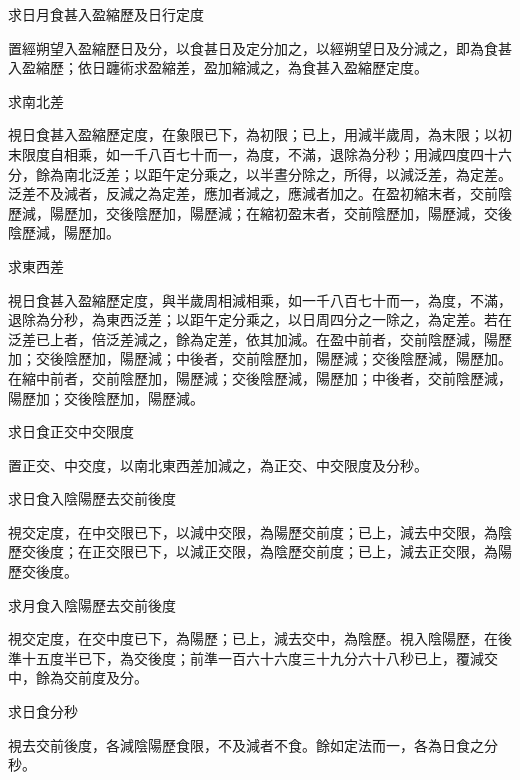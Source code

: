 \begin{pinyinscope}
 求日月食甚入盈縮歷及日行定度



 置經朔望入盈縮歷日及分，以食甚日及定分加之，以經朔望日及分減之，即為食甚入盈縮歷；依日躔術求盈縮差，盈加縮減之，為食甚入盈縮歷定度。



 求南北差



 視日食甚入盈縮歷定度，在象限已下，為初限；已上，用減半歲周，為末限；以初末限度自相乘，如一千八百七十而一，為度，不滿，退除為分秒；用減四度四十六分，餘為南北泛差；以距午定分乘之，以半晝分除之，所得，以減泛差，為定差。泛差不及減者，反減之為定差，應加者減之，應減者加之。在盈初縮末者，交前陰歷減，陽歷加，交後陰歷加，陽歷減；在縮初盈末者，交前陰歷加，陽歷減，交後陰歷減，陽歷加。



 求東西差



 視日食甚入盈縮歷定度，與半歲周相減相乘，如一千八百七十而一，為度，不滿，退除為分秒，為東西泛差；以距午定分乘之，以日周四分之一除之，為定差。若在泛差已上者，倍泛差減之，餘為定差，依其加減。在盈中前者，交前陰歷減，陽歷加；交後陰歷加，陽歷減；中後者，交前陰歷加，陽歷減；交後陰歷減，陽歷加。在縮中前者，交前陰歷加，陽歷減；交後陰歷減，陽歷加；中後者，交前陰歷減，陽歷加；交後陰歷加，陽歷減。



 求日食正交中交限度



 置正交、中交度，以南北東西差加減之，為正交、中交限度及分秒。



 求日食入陰陽歷去交前後度



 視交定度，在中交限已下，以減中交限，為陽歷交前度；已上，減去中交限，為陰歷交後度；在正交限已下，以減正交限，為陰歷交前度；已上，減去正交限，為陽歷交後度。



 求月食入陰陽歷去交前後度



 視交定度，在交中度已下，為陽歷；已上，減去交中，為陰歷。視入陰陽歷，在後準十五度半已下，為交後度；前準一百六十六度三十九分六十八秒已上，覆減交中，餘為交前度及分。



 求日食分秒



 視去交前後度，各減陰陽歷食限，不及減者不食。餘如定法而一，各為日食之分秒。




\end{pinyinscope}
